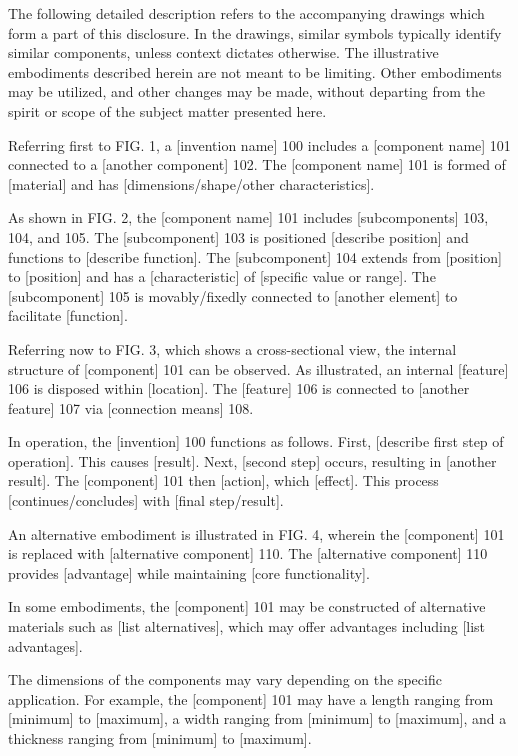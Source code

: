 \documentclass[12pt,letterpaper]{article}
\begin{document}
The following detailed description refers to the accompanying drawings which form a part of this disclosure. In the drawings, similar symbols typically identify similar components, unless context dictates otherwise. The illustrative embodiments described herein are not meant to be limiting. Other embodiments may be utilized, and other changes may be made, without departing from the spirit or scope of the subject matter presented here.

Referring first to FIG. 1, a [invention name] 100 includes a [component name] 101 connected to a [another component] 102. The [component name] 101 is formed of [material] and has [dimensions/shape/other characteristics].

As shown in FIG. 2, the [component name] 101 includes [subcomponents] 103, 104, and 105. The [subcomponent] 103 is positioned [describe position] and functions to [describe function]. The [subcomponent] 104 extends from [position] to [position] and has a [characteristic] of [specific value or range]. The [subcomponent] 105 is movably/fixedly connected to [another element] to facilitate [function].

Referring now to FIG. 3, which shows a cross-sectional view, the internal structure of [component] 101 can be observed. As illustrated, an internal [feature] 106 is disposed within [location]. The [feature] 106 is connected to [another feature] 107 via [connection means] 108.

In operation, the [invention] 100 functions as follows. First, [describe first step of operation]. This causes [result]. Next, [second step] occurs, resulting in [another result]. The [component] 101 then [action], which [effect]. This process [continues/concludes] with [final step/result].

An alternative embodiment is illustrated in FIG. 4, wherein the [component] 101 is replaced with [alternative component] 110. The [alternative component] 110 provides [advantage] while maintaining [core functionality].

In some embodiments, the [component] 101 may be constructed of alternative materials such as [list alternatives], which may offer advantages including [list advantages].

The dimensions of the components may vary depending on the specific application. For example, the [component] 101 may have a length ranging from [minimum] to [maximum], a width ranging from [minimum] to [maximum], and a thickness ranging from [minimum] to [maximum].
\end{document}
